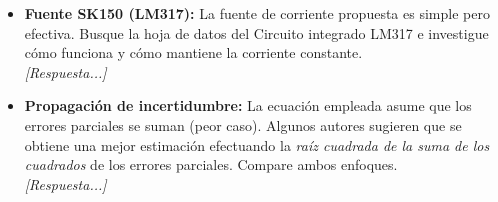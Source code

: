 \begin{itemize}
    \item \textbf{Fuente SK150 (LM317):} La fuente de corriente propuesta es simple pero efectiva. Busque la hoja de datos del Circuito integrado LM317 e investigue cómo funciona y cómo mantiene la corriente constante.
    \\ \textit{[Respuesta...]}

    \item \textbf{Propagación de incertidumbre:} La ecuación empleada asume que los errores parciales se suman (peor caso). Algunos autores sugieren que se obtiene una mejor estimación efectuando la \textit{raíz cuadrada de la suma de los cuadrados} de los errores parciales. Compare ambos enfoques.
    \\ \textit{[Respuesta...]}
\end{itemize}
